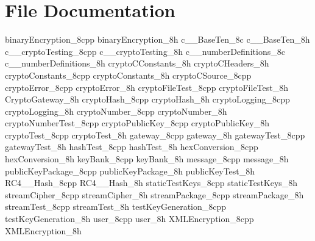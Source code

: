 	\chapter{File Documentation}
	
		{binaryEncryption_8cpp}
		{binaryEncryption_8h}
		{c__BaseTen_8c}
		{c__BaseTen_8h}
		{c__cryptoTesting_8cpp}
		{c__cryptoTesting_8h}
		{c__numberDefinitions_8c}
		{c__numberDefinitions_8h}
		{cryptoCConstants_8h}
		{cryptoCHeaders_8h}
		{cryptoConstants_8cpp}
		{cryptoConstants_8h}
		{cryptoCSource_8cpp}
		{cryptoError_8cpp}
		{cryptoError_8h}
		{cryptoFileTest_8cpp}
		{cryptoFileTest_8h}
		{CryptoGateway_8h}
		{cryptoHash_8cpp}
		{cryptoHash_8h}
		{cryptoLogging_8cpp}
		{cryptoLogging_8h}
		{cryptoNumber_8cpp}
		{cryptoNumber_8h}
		{cryptoNumberTest_8cpp}
		{cryptoPublicKey_8cpp}
		{cryptoPublicKey_8h}
		{cryptoTest_8cpp}
		{cryptoTest_8h}
		{gateway_8cpp}
		{gateway_8h}
		{gatewayTest_8cpp}
		{gatewayTest_8h}
		{hashTest_8cpp}
		{hashTest_8h}
		{hexConversion_8cpp}
		{hexConversion_8h}
		{keyBank_8cpp}
		{keyBank_8h}
		{message_8cpp}
		{message_8h}
		{publicKeyPackage_8cpp}
		{publicKeyPackage_8h}
		{publicKeyTest_8h}
		{RC4__Hash_8cpp}
		{RC4__Hash_8h}
		{staticTestKeys_8cpp}
		{staticTestKeys_8h}
		{streamCipher_8cpp}
		{streamCipher_8h}
		{streamPackage_8cpp}
		{streamPackage_8h}
		{streamTest_8cpp}
		{streamTest_8h}
		{testKeyGeneration_8cpp}
		{testKeyGeneration_8h}
		{user_8cpp}
		{user_8h}
		{XMLEncryption_8cpp}
		{XMLEncryption_8h}
